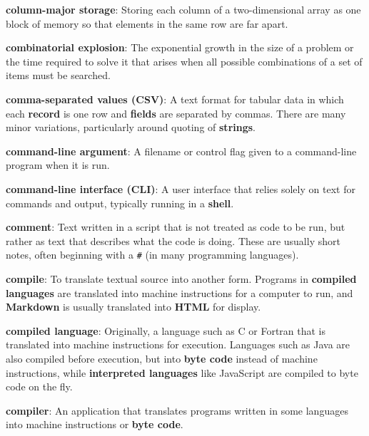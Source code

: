 \documentclass[krantzl]{krantz}
\newcommand{\glosskey}[1]{\textbf{#1}}
\begin{document}
\noindent \textbf{{\newline}\glosskey{column-major storage}}: 
Storing each column of a two-dimensional array as one block of memory so that elements in the same row are far apart.


\noindent \textbf{{\newline}\glosskey{combinatorial explosion}}: 
The exponential growth in the size of a problem or the time required to solve it that arises when all possible combinations of a set of items must be searched.


\noindent \textbf{{\newline}\glosskey{comma-separated values} (CSV)}: 
A text format for tabular data in which each \glosskey{record} is one row and \glosskey{fields} are separated by commas. There are many minor variations, particularly around quoting of \glosskey{strings}.


\noindent \textbf{{\newline}\glosskey{command-line argument}}: 
A filename or control flag given to a command-line program when it is run.


\noindent \textbf{{\newline}\glosskey{command-line interface} (CLI)}: 
A user interface that relies solely on text for commands and output, typically running in a \glosskey{shell}.


\noindent \textbf{{\newline}\glosskey{comment}}: 
Text written in a script that is not treated as code to be run, but rather as text that describes what the code is doing. These are usually short notes, often beginning with a \texttt{\#} (in many programming languages).


\noindent \textbf{{\newline}\glosskey{compile}}: 
To translate textual source into another form. Programs in \glosskey{compiled languages} are translated into machine instructions for a computer to run, and \glosskey{Markdown} is usually translated into \glosskey{HTML} for display.


\noindent \textbf{{\newline}\glosskey{compiled language}}: 
Originally, a language such as C or Fortran that is translated into machine instructions for execution. Languages such as Java are also compiled before execution, but into \glosskey{byte code} instead of machine instructions, while \glosskey{interpreted languages} like JavaScript are compiled to byte code on the fly.


\noindent \textbf{{\newline}\glosskey{compiler}}: 
An application that translates programs written in some languages into machine instructions or \glosskey{byte code}.
\end{document}
